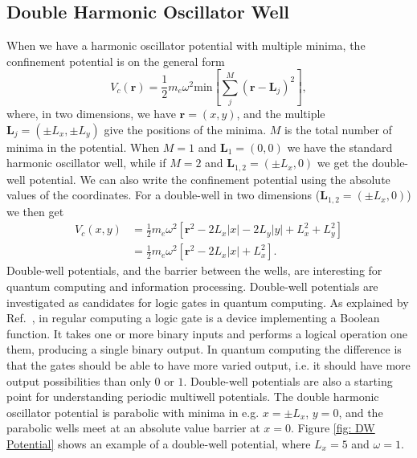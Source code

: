 \documentclass[../main.tex]{subfiles}
\begin{document}
\subsection{Double Harmonic Oscillator Well}

When we have a harmonic oscillator potential with multiple minima, the confinement potential is on the general form\cite{master project}
\begin{equation}
    V_c(\mathbf{r}) = \frac{1}{2} m_e \omega^2 \textrm{min}\left[\sum_j^M (\mathbf{r}-\mathbf{L}_j)^2\right],
\end{equation}
where, in two dimensions, we have $\mathbf{r} = (x,y)$, and the multiple $\mathbf{L}_j = (\pm L_x, \pm L_y)$ give the positions of the minima. $M$ is the total number of minima in the potential. When $M=1$ and $\mathbf{L}_1 = (0,0)$ we have the standard harmonic oscillator well, while if $M=2$ and $\mathbf{L}_{1,2} = (\pm L_x, 0)$ we get the double-well potential. We can also write the confinement potential using the absolute values of the coordinates. For a double-well in two dimensions ($\mathbf{L}_{1,2} = (\pm L_x, 0)$) we then get
\begin{equation}\label{eq: DW Potential}
\begin{split}
    V_c(x,y) &= \frac{1}{2} m_e \omega^2[\mathbf{r}^2 - 2L_x|x| - 2L_y|y| + L_x^2 + L_y^2]\\
    &= \frac{1}{2} m_e \omega^2[\mathbf{r}^2 - 2L_x|x| + L_x^2].
\end{split}
\end{equation}
Double-well potentials, and the barrier between the wells, are interesting for quantum computing and information processing. Double-well potentials are investigated as candidates for logic gates in quantum computing\cite{Multiwells}. As explained by Ref.~\cite{Logic Gate}, in regular computing a logic gate is a device implementing a Boolean function. It takes one or more binary inputs and performs a logical operation one them, producing a single binary output. In quantum computing the difference is that the gates should be able to have more varied output, i.e. it should have more output possibilities than only $0$ or $1$. Double-well potentials are also a starting point for understanding periodic multiwell potentials. The double harmonic oscillator potential is parabolic with minima in e.g. $x = \pm L_x$, $y = 0$, and the parabolic wells meet at an absolute value barrier at $x=0$. Figure \ref{fig: DW Potential} shows an example of a double-well potential, where $L_x = 5$ and $\omega = 1$.
\end{document}
